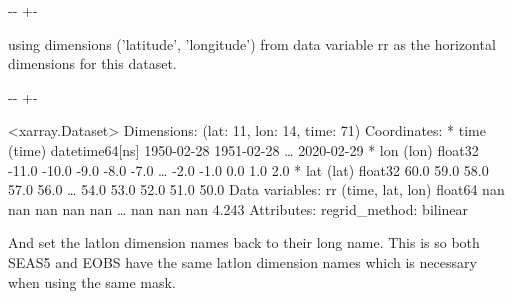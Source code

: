 \documentclass[letterpaper,10pt,english]{sphinxmanual}
\newlength\nbsphinxcodecellspacing
\begin{document}
{
\begin{sphinxVerbatim}[commandchars=\\\{\}]
\llap{\color{nbsphinxin}[27]:\,\hspace{\fboxrule}\hspace{\fboxsep}}  
\end{sphinxVerbatim}
}

{

\kern-\sphinxverbatimsmallskipamount\kern-\baselineskip
\kern+\FrameHeightAdjust\kern-\fboxrule
\vspace{\nbsphinxcodecellspacing}

\begin{sphinxVerbatim}[commandchars=\\\{\}]
using dimensions ('latitude', 'longitude') from data variable rr as the horizontal dimensions for this dataset.
\end{sphinxVerbatim}
}

{

\kern-\sphinxverbatimsmallskipamount\kern-\baselineskip
\kern+\FrameHeightAdjust\kern-\fboxrule
\vspace{\nbsphinxcodecellspacing}

\begin{sphinxVerbatim}[commandchars=\\\{\}]
\llap{\color{nbsphinxout}[27]:\,\hspace{\fboxrule}\hspace{\fboxsep}}<xarray.Dataset>
Dimensions:  (lat: 11, lon: 14, time: 71)
Coordinates:
  * time     (time) datetime64[ns] 1950-02-28 1951-02-28 {\ldots} 2020-02-29
  * lon      (lon) float32 -11.0 -10.0 -9.0 -8.0 -7.0 {\ldots} -2.0 -1.0 0.0 1.0 2.0
  * lat      (lat) float32 60.0 59.0 58.0 57.0 56.0 {\ldots} 54.0 53.0 52.0 51.0 50.0
Data variables:
    rr       (time, lat, lon) float64 nan nan nan nan nan {\ldots} nan nan nan 4.243
Attributes:
    regrid\_method:  bilinear
\end{sphinxVerbatim}
}

And set the latlon dimension names back to their long name. This is so both SEAS5 and EOBS have the same latlon dimension names which is necessary when using the same mask.
\end{document}
